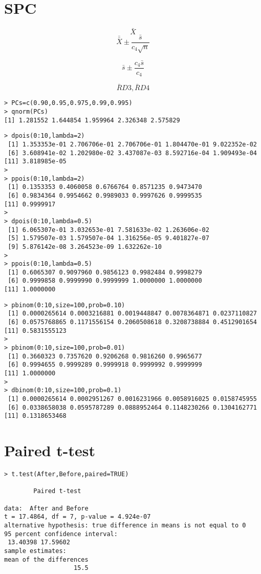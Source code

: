 \documentclass[a4paper,12pt]{article}
\begin{document}
\section{SPC}

\[ \bar{X} \]
\[\bar{\bar{X}}  \pm \frac{\bar{s}}{c_4\sqrt{n}} \]


\[ \bar{s} \pm \frac{c_4\bar{s}}{c_4}\]

\[\bar{R}D3, \bar{R}D4\]




\begin{verbatim}
> PCs=c(0.90,0.95,0.975,0.99,0.995)
> qnorm(PCs)
[1] 1.281552 1.644854 1.959964 2.326348 2.575829
\end{verbatim}
\begin{verbatim}
> dpois(0:10,lambda=2)
 [1] 1.353353e-01 2.706706e-01 2.706706e-01 1.804470e-01 9.022352e-02
 [6] 3.608941e-02 1.202980e-02 3.437087e-03 8.592716e-04 1.909493e-04
[11] 3.818985e-05
> 
> ppois(0:10,lambda=2)
 [1] 0.1353353 0.4060058 0.6766764 0.8571235 0.9473470
 [6] 0.9834364 0.9954662 0.9989033 0.9997626 0.9999535
[11] 0.9999917
>
> dpois(0:10,lambda=0.5)
 [1] 6.065307e-01 3.032653e-01 7.581633e-02 1.263606e-02
 [5] 1.579507e-03 1.579507e-04 1.316256e-05 9.401827e-07
 [9] 5.876142e-08 3.264523e-09 1.632262e-10
>
> ppois(0:10,lambda=0.5)
 [1] 0.6065307 0.9097960 0.9856123 0.9982484 0.9998279
 [6] 0.9999858 0.9999990 0.9999999 1.0000000 1.0000000
[11] 1.0000000
\end{verbatim}
\begin{verbatim}
> pbinom(0:10,size=100,prob=0.10)
 [1] 0.0000265614 0.0003216881 0.0019448847 0.0078364871 0.0237110827
 [6] 0.0575768865 0.1171556154 0.2060508618 0.3208738884 0.4512901654
[11] 0.5831555123
>
> pbinom(0:10,size=100,prob=0.01)
 [1] 0.3660323 0.7357620 0.9206268 0.9816260 0.9965677 
 [6] 0.9994655 0.9999289 0.9999918 0.9999992 0.9999999 
[11] 1.0000000
>
> dbinom(0:10,size=100,prob=0.1)
 [1] 0.0000265614 0.0002951267 0.0016231966 0.0058916025 0.0158745955
 [6] 0.0338658038 0.0595787289 0.0888952464 0.1148230266 0.1304162771
[11] 0.1318653468
\end{verbatim}
\newpage
\section{Paired t-test}
\begin{verbatim}
> t.test(After,Before,paired=TRUE)

        Paired t-test

data:  After and Before 
t = 17.4864, df = 7, p-value = 4.924e-07
alternative hypothesis: true difference in means is not equal to 0 
95 percent confidence interval:
 13.40398 17.59602 
sample estimates:
mean of the differences 
                   15.5 
\end{verbatim}
\end{document}
